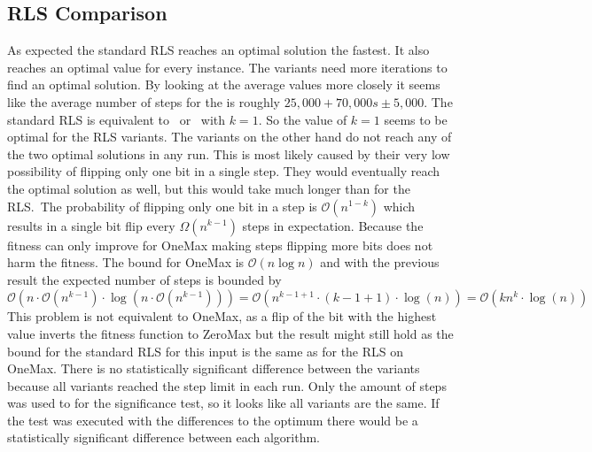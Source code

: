 \subsection{RLS Comparison}

As expected the standard RLS reaches an optimal solution the fastest.
It also reaches an optimal value for every instance.
The \RLSR[s] variants need more iterations to find an optimal solution.
By looking at the average values more closely it seems like the average number of steps for the \RLSR[s] is roughly $25,000 + 70,000s \pm 5,000$.
The standard RLS is equivalent to \RLSR~or \RLSN~with $k=1$.
So the value of $k=1$ seems to be optimal for the RLS variants.
The \RLSN[b] variants on the other hand do not reach any of the two optimal solutions in any run.
This is most likely caused by their very low possibility of flipping only one bit in a single step.
They would eventually reach the optimal solution as well, but this would take much longer than for the RLS.\
The probability of flipping only one bit in a step is $\mathcal{O}(n^{1-k})$ which results in a single bit flip every $\Omega(n^{k-1})$ steps in expectation.
Because the fitness can only improve for OneMax making steps flipping more bits does not harm the fitness.
The bound for OneMax is $\mathcal{O}(n\log n)$ and with the previous result the expected number of steps is bounded by
$\mathcal{O}(n\cdot\mathcal{O}(n^{k-1})\cdot \log(n\cdot\mathcal{O}(n^{k-1}))) 
=\mathcal{O}(n^{k-1+1}\cdot (k-1+1)\cdot\log(n))
=\mathcal{O}(kn^{k}\cdot\log(n))$
This problem is not equivalent to OneMax, as a flip of the bit with the highest value inverts the fitness function to ZeroMax but the result might still hold as the bound for the standard RLS for this input is the same as for the RLS on OneMax.
There is no statistically significant difference between the \RLSN[b] variants because all variants reached the step limit in each run.
Only the amount of steps was used to for the significance test, so it looks like all variants are the same.
If the test was executed with the differences to the optimum there would be a statistically significant difference between each algorithm.
